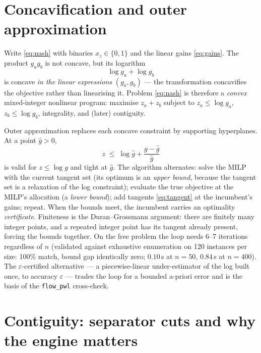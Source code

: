 \documentclass[11pt]{article}
\theoremstyle{definition}
\newcommand{\ga}{g_a}
\newcommand{\gb}{g_b}
\begin{document}
\section{Concavification and outer approximation}\label{sec:oa}

Write \eqref{eq:nash} with binaries $x_z\in\{0,1\}$ and the linear gains
\eqref{eq:gains}. The product $\ga\gb$ is not concave, but its logarithm
\begin{equation}
\log \ga + \log \gb
\end{equation}
is concave \emph{in the linear expressions} $(\ga,\gb)$ --- the transformation
concavifies the objective rather than linearising it. Problem \eqref{eq:nash} is
therefore a \emph{convex} mixed-integer nonlinear program: maximise
$z_a+z_b$ subject to $z_a\le\log\ga$, $z_b\le\log\gb$, integrality, and (later)
contiguity.

Outer approximation \citep{duran1986,fletcher1994} replaces each concave constraint by
supporting hyperplanes. At a point $\hat g>0$,
\begin{equation}\label{eq:tangent}
z \;\le\; \log \hat g + \frac{g-\hat g}{\hat g}
\end{equation}
is valid for $z\le\log g$ and tight at $\hat g$. The algorithm alternates: solve the
MILP with the current tangent set (its optimum is an \emph{upper bound}, because the
tangent set is a relaxation of the log constraint); evaluate the true objective at the
MILP's allocation (a \emph{lower bound}); add tangents \eqref{eq:tangent} at the
incumbent's gains; repeat. When the bounds meet, the incumbent carries an optimality
\emph{certificate}. Finiteness is the Duran--Grossmann argument: there are finitely many
integer points, and a repeated integer point has its tangent already present, forcing
the bounds together. On the free problem the loop needs 6--7 iterations regardless of
$n$ (validated against exhaustive enumeration on 120 instances per size: 100\% match,
bound gap identically zero; $0.10$\,s at $n=50$, $0.84$\,s at $n=400$). The
$\varepsilon$-certified alternative --- a piecewise-linear under-estimator of the log
built once, to accuracy $\varepsilon$ \citep{caragiannis2019,vielma2011} --- trades the
loop for a bounded a-priori error and is the basis of the \texttt{flow\_pwl}
cross-check.

\section{Contiguity: separator cuts and why the engine matters}\label{sec:contiguity}
\end{document}
